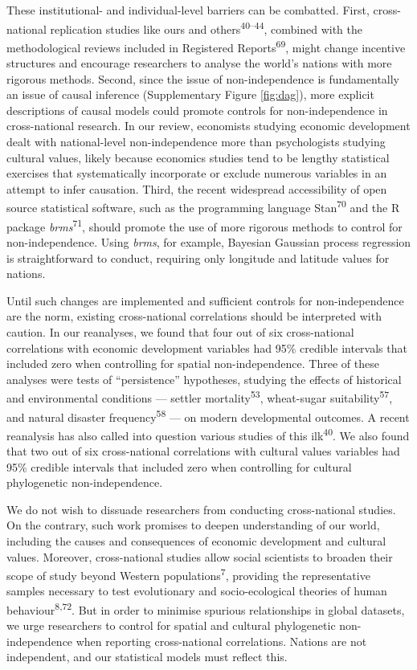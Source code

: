 \documentclass[
  man,floatsintext]{apa6}
\begin{document}
These institutional- and individual-level barriers can be combatted. First, cross-national replication studies like ours and others\textsuperscript{40--44}, combined with the methodological reviews included in Registered Reports\textsuperscript{69}, might change incentive structures and encourage researchers to analyse the world's nations with more rigorous methods. Second, since the issue of non-independence is fundamentally an issue of causal inference (Supplementary Figure \ref{fig:dag}), more explicit descriptions of causal models could promote controls for non-independence in cross-national research. In our review, economists studying economic development dealt with national-level non-independence more than psychologists studying cultural values, likely because economics studies tend to be lengthy statistical exercises that systematically incorporate or exclude numerous variables in an attempt to infer causation. Third, the recent widespread accessibility of open source statistical software, such as the programming language Stan\textsuperscript{70} and the R package \emph{brms}\textsuperscript{71}, should promote the use of more rigorous methods to control for non-independence. Using \emph{brms}, for example, Bayesian Gaussian process regression is straightforward to conduct, requiring only longitude and latitude values for nations.

Until such changes are implemented and sufficient controls for non-independence are the norm, existing cross-national correlations should be interpreted with caution. In our reanalyses, we found that four out of six cross-national correlations with economic development variables had 95\% credible intervals that included zero when controlling for spatial non-independence. Three of these analyses were tests of ``persistence'' hypotheses, studying the effects of historical and environmental conditions --- settler mortality\textsuperscript{53}, wheat-sugar suitability\textsuperscript{57}, and natural disaster frequency\textsuperscript{58} --- on modern developmental outcomes. A recent reanalysis has also called into question various studies of this ilk\textsuperscript{40}. We also found that two out of six cross-national correlations with cultural values variables had 95\% credible intervals that included zero when controlling for cultural phylogenetic non-independence.

We do not wish to dissuade researchers from conducting cross-national studies. On the contrary, such work promises to deepen understanding of our world, including the causes and consequences of economic development and cultural values. Moreover, cross-national studies allow social scientists to broaden their scope of study beyond Western populations\textsuperscript{7}, providing the representative samples necessary to test evolutionary and socio-ecological theories of human behaviour\textsuperscript{8,72}. But in order to minimise spurious relationships in global datasets, we urge researchers to control for spatial and cultural phylogenetic non-independence when reporting cross-national correlations. Nations are not independent, and our statistical models must reflect this.
\end{document}

